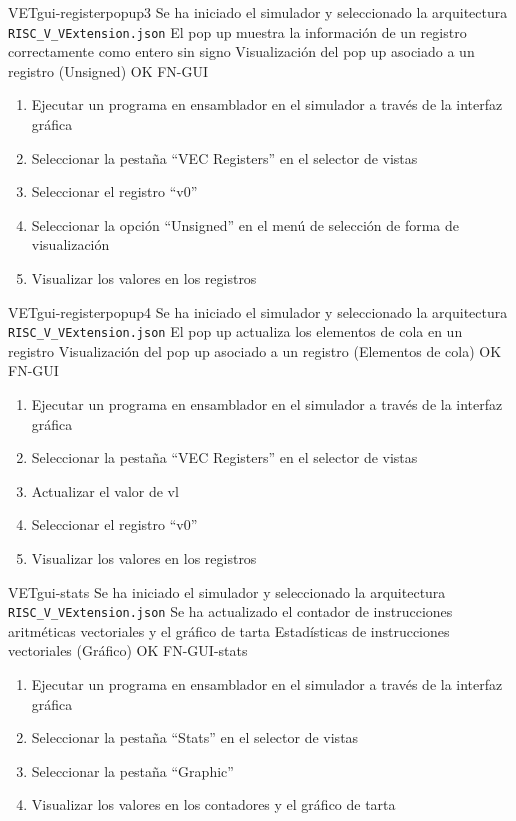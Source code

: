 \begin{testCase}{VET}{gui-registerpopup3}
    {Se ha iniciado el simulador y seleccionado la arquitectura \texttt{RISC\_V\_VExtension.json}}
    {El pop up muestra la información de un registro correctamente como entero sin signo}
    {Visualización del pop up asociado a un registro (Unsigned)} %
    {OK} %
    {FN-GUI}
    \begin{enumerate}
        \item Ejecutar un programa en ensamblador en el simulador a través de la interfaz gráfica
        \item Seleccionar la pestaña ``VEC Registers'' en el selector de vistas
        \item Seleccionar el registro ``v0''
        \item Seleccionar la opción ``Unsigned'' en el menú de selección de forma de visualización
        \item Visualizar los valores en los registros
    \end{enumerate}
\end{testCase}

\begin{testCase}{VET}{gui-registerpopup4}
    {Se ha iniciado el simulador y seleccionado la arquitectura \texttt{RISC\_V\_VExtension.json}}
    {El pop up actualiza los elementos de cola en un registro}
    {Visualización del pop up asociado a un registro (Elementos de cola)} %
    {OK} %
    {FN-GUI}
    \begin{enumerate}
        \item Ejecutar un programa en ensamblador en el simulador a través de la interfaz gráfica
        \item Seleccionar la pestaña ``VEC Registers'' en el selector de vistas
        \item Actualizar el valor de vl
        \item Seleccionar el registro ``v0''
        \item Visualizar los valores en los registros
    \end{enumerate}
\end{testCase}

\begin{testCase}{VET}{gui-stats}
    {Se ha iniciado el simulador y seleccionado la arquitectura \texttt{RISC\_V\_VExtension.json}}
    {Se ha actualizado el contador de instrucciones aritméticas vectoriales y el gráfico de tarta}
    {Estadísticas de instrucciones vectoriales (Gráfico)} %
    {OK} %
    {FN-GUI-stats}
    \begin{enumerate}
        \item Ejecutar un programa en ensamblador en el simulador a través de la interfaz gráfica
        \item Seleccionar la pestaña ``Stats'' en el selector de vistas
        \item Seleccionar la pestaña ``Graphic''
        \item Visualizar los valores en los contadores y el gráfico de tarta
    \end{enumerate}
\end{testCase}

